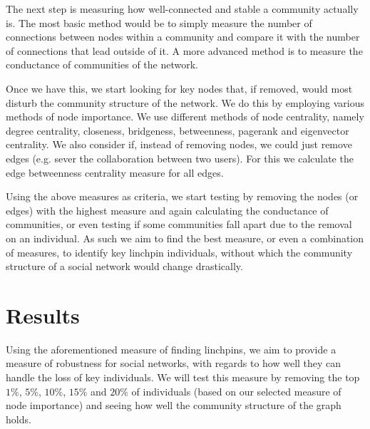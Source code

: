 \documentclass[9pt,twocolumn,twoside]{pnas-new}
\begin{document}
The next step is measuring how well-connected and stable a community actually is.
The most basic method would be to simply measure the number of connections between nodes within a community and compare it with the number of connections that lead outside of it.
A more advanced method is to measure the conductance \cite{leskovec-lang-mahoney} of communities of the network. 

Once we have this, we start looking for key nodes that, if removed, would most disturb the community structure of the network.
We do this by employing various methods of node importance.
We use different methods of node centrality, namely degree centrality, closeness, bridgeness, betweenness, pagerank and eigenvector centrality.
We also consider if, instead of removing nodes, we could just remove edges (e.g. sever the collaboration between two users).
For this we calculate the edge betweenness centrality measure for all edges.

Using the above measures as criteria, we start testing by removing the nodes (or edges) with the highest measure and 
again calculating the conductance of communities, 
or even testing if some communities fall apart due to the removal on an individual.
As such we aim to find the best measure, or even a combination of measures, to identify key linchpin individuals, 
without which the community structure of a social network would change drastically.

\section*{Results}

Using the aforementioned measure of finding linchpins, we aim to provide a measure of robustness for social networks,
with regards to how well they can handle the loss of key individuals. 
We will test this measure by removing the top $1\%$, $5\%$, $10\%$, $15\%$ and $20\%$ of individuals (based on our selected measure of node importance) 
and seeing how well the community structure of the graph holds.



\end{document}
